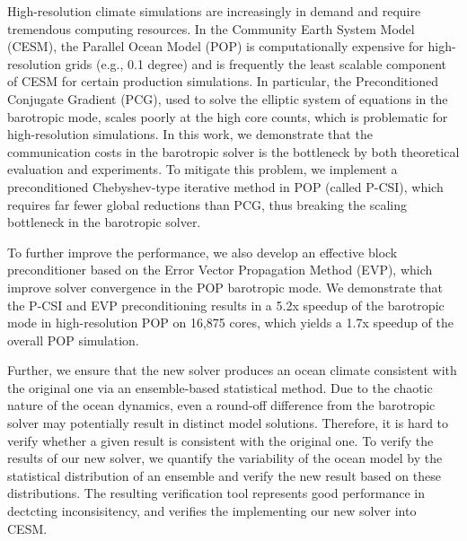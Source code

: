 \begin{eabstract}
  High-resolution climate simulations are increasingly in demand and
  require tremendous computing resources. 
  In the Community Earth System Model (CESM), the Parallel Ocean Model (POP) is
  computationally expensive for high-resolution grids (e.g., 0.1 degree) and is frequently the least scalable component of CESM for certain
  production simulations. 
  In particular, the Preconditioned Conjugate Gradient (PCG), used to solve the elliptic system of
  equations in the barotropic mode, scales poorly at the high core counts, which is problematic for high-resolution simulations. 
  In this work, we demonstrate that the communication costs in the
  barotropic solver is the bottleneck by both theoretical evaluation and experiments. 
  To mitigate this problem, we implement a preconditioned Chebyshev-type iterative
  method in POP (called P-CSI), which requires far fewer global
  reductions than PCG, thus breaking the scaling bottleneck in the barotropic solver. 


  To further improve the performance, we also develop an effective block preconditioner based on the Error Vector Propagation Method (EVP), which improve solver convergence in the POP barotropic mode.
  We demonstrate that the P-CSI and EVP preconditioning results in a 5.2x speedup of
  the barotropic mode in high-resolution POP on 16,875 cores, which
  yields a 1.7x speedup of the overall POP simulation.  

  Further, we ensure that the new solver produces an ocean climate consistent with the original one via an ensemble-based statistical method. 
  Due to the chaotic nature of the ocean dynamics, even a round-off difference from the barotropic solver may potentially result in distinct model solutions. Therefore, it is hard to verify whether a given result is consistent with the original one. 
  To verify the results of our new solver, we quantify the variability of the ocean model by the statistical distribution of an ensemble and verify the new result based on these distributions. 
  The resulting verification tool represents good performance in dectcting inconsisitency, and verifies the implementing our new solver into CESM. 



\end{eabstract}


